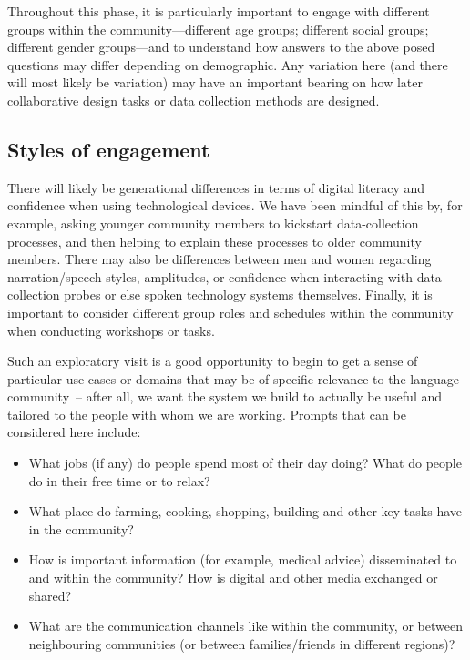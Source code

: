 \documentclass[10pt,twoside,openright]{report}
\begin{document}
Throughout this phase, it is particularly important to engage with different groups within the community---different age groups; different social groups; different gender groups---and to understand how answers to the above posed questions may differ depending on demographic.
Any variation here (and there will most likely be variation) may have an important bearing on how later collaborative design tasks or data collection methods are designed.

\vspace{-0.8em}
\begin{unmutehighlight}
\section*{Styles of engagement}
There will likely be generational differences in terms of digital literacy and confidence when using technological devices.
We have been mindful of this by, for example, asking younger community members to kickstart data-collection processes, and then helping to explain these processes to older community members. 
There may also be differences between men and women regarding narration/speech styles, amplitudes, or confidence when interacting with data collection probes or else spoken technology systems themselves.
Finally, it is important to consider different group roles and schedules within the community when conducting workshops or tasks.
\end{unmutehighlight}

Such an exploratory visit is a good opportunity to begin to get a sense of particular use-cases or domains that may be of specific relevance to the language community~-- after all, we want the system we build to actually be useful and tailored to the people with whom we are working.
Prompts that can be considered here include:

\begin{itemize}
    \item What jobs (if any) do people spend most of their day doing? What do people do in their free time or to relax?
    \item What place do farming, cooking, shopping, building and other key tasks have in the community?
    \item How is important information (for example, medical advice) disseminated to and within the community? How is digital and other media exchanged or shared?
    \item What are the communication channels like within the community, or between neighbouring communities (or between families/friends in different regions)? 
\end{itemize}
\end{document}
